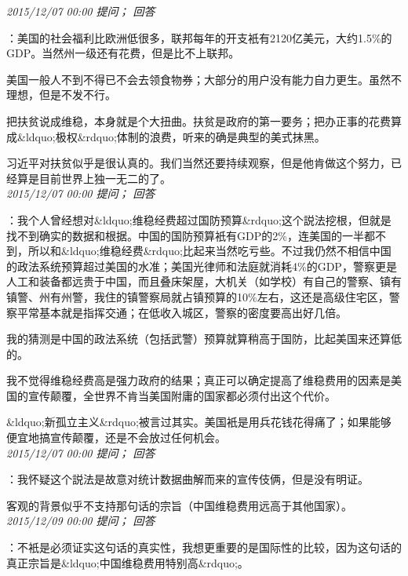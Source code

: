 \documentclass[twocolumn]{ctexart}
\begin{document}
\textit{\hfill\noindent\small 2015/12/07 00:00 提问； 回答}

：美国的社会福利比欧洲低很多，联邦每年的开支衹有2120亿美元，大约1.5\%的GDP。当然州一级还有花费，但是比不上联邦。

美国一般人不到不得已不会去领食物券；大部分的用户没有能力自力更生。虽然不理想，但是不发不行。

把扶贫说成维稳，本身就是个大扭曲。扶贫是政府的第一要务；把办正事的花费算成\&ldquo;极权\&rdquo;体制的浪费，听来的确是典型的美式抹黑。

习近平对扶贫似乎是很认真的。我们当然还要持续观察，但是他肯做这个努力，已经算是目前世界上独一无二的了。\\

\textit{\hfill\noindent\small 2015/12/07 00:00 提问； 回答}

：我个人曾经想对\&ldquo;维稳经费超过国防预算\&rdquo;这个説法挖根，但就是找不到确实的数据和根据。中国的国防预算衹有GDP的2\%，连美国的一半都不到，所以和\&ldquo;维稳经费\&rdquo;比起来当然吃亏些。不过我仍然不相信中国的政法系统预算超过美国的水准；美国光律师和法庭就消耗4\%的GDP，警察更是人工和装备都远贵于中国，而且叠床架屋，大机关（如学校）有自己的警察、镇有镇警、州有州警，我住的镇警察局就占镇预算的10\%左右，这还是高级住宅区，警察平常基本就是指挥交通；在低收入城区，警察的密度要高出好几倍。

我的猜测是中国的政法系统（包括武警）预算就算稍高于国防，比起美国来还算低的。

我不觉得维稳经费高是强力政府的结果；真正可以确定提高了维稳费用的因素是美国的宣传颠覆，全世界不肯当美国附庸的国家都必须付出这个代价。

\&ldquo;新孤立主义\&rdquo;被言过其实。美国衹是用兵花钱花得痛了；如果能够便宜地搞宣传颠覆，还是不会放过任何机会。\\

\textit{\hfill\noindent\small 2015/12/07 00:00 提问； 回答}

：我怀疑这个説法是故意对统计数据曲解而来的宣传伎俩，但是没有明证。

客观的背景似乎不支持那句话的宗旨（中国维稳费用远高于其他国家）。\\

\textit{\hfill\noindent\small 2015/12/09 00:00 提问； 回答}

：不衹是必须证实这句话的真实性，我想更重要的是国际性的比较，因为这句话的真正宗旨是\&ldquo;中国维稳费用特别高\&rdquo;。\\
\end{document}
